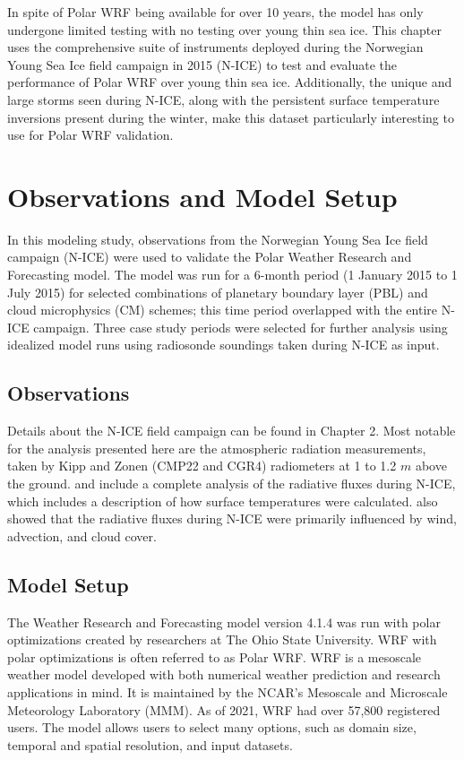 In spite of Polar WRF being available for over 10 years, the model has only undergone limited testing with no testing over young thin sea ice. This chapter uses the comprehensive suite of instruments deployed during the Norwegian Young Sea Ice field campaign in 2015 (N-ICE) to test and evaluate the performance of Polar WRF over young thin sea ice. Additionally, the unique and large storms seen during N-ICE, along with the persistent surface temperature inversions present during the winter, make this dataset particularly interesting to use for Polar WRF validation.

\section{Observations and Model Setup}
In this modeling study, observations from the Norwegian Young Sea Ice field campaign (N-ICE) were used to validate the Polar Weather Research and Forecasting model. The model was run for a 6-month period (1 January 2015 to 1 July 2015) for selected combinations of planetary boundary layer (PBL) and cloud microphysics (CM) schemes; this time period overlapped with the entire N-ICE campaign. Three case study periods were selected for further analysis using idealized model runs using radiosonde soundings taken during N-ICE as input.

\subsection{Observations}
Details about the N-ICE field campaign can be found in Chapter 2. Most notable for the analysis presented here are the atmospheric radiation measurements, taken by Kipp and Zonen (CMP22 and CGR4) radiometers at 1 to 1.2 $m$ above the ground. \citet{granskog:2015} and \citet{walden:2017} include a complete analysis of the radiative fluxes during N-ICE, which includes a description of how surface temperatures were calculated. \citet{walden:2017} also showed that the radiative fluxes during N-ICE were primarily influenced by wind, advection, and cloud cover. 

\subsection{Model Setup}
The Weather Research and Forecasting model version 4.1.4 was run with polar optimizations created by researchers at The Ohio State University. WRF with polar optimizations is often referred to as Polar WRF. WRF is a mesoscale weather model developed with both numerical weather prediction and research applications in mind. It is maintained by the NCAR's Mesoscale and Microscale Meteorology Laboratory (MMM). As of 2021, WRF had over 57,800 registered users. The model allows users to select many options, such as domain size, temporal and spatial resolution, and input datasets.


